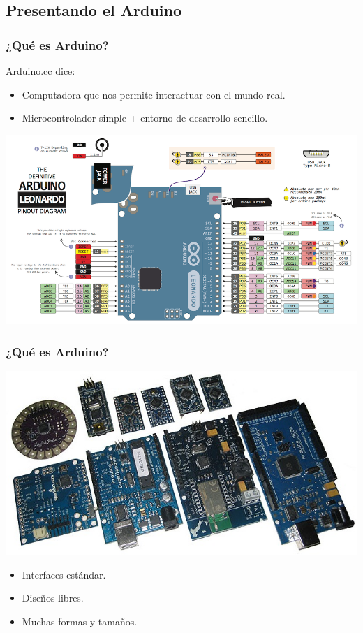 \documentclass[compress]{beamer}
\begin{document}
\subsection{Presentando el Arduino}

\begin{frame}
 \frametitle{¿Qué es Arduino?}
\begin{block}{Arduino.cc dice:} 
\begin{itemize}
 \item Computadora que nos permite interactuar con el mundo real.
 \item Microcontrolador simple + entorno de desarrollo sencillo.
\end{itemize}
\end{block}
\begin{center}
 \includegraphics[height=0.6\textheight]{./img/arduino-leonardo-pinout.png}
\end{center}
\end{frame}

\begin{frame}
 \frametitle{¿Qué es Arduino?}
 \includegraphics[width=\columnwidth]{./img/arduinos.jpg}
  \begin{itemize}
   \item Interfaces estándar.
   \item Diseños libres.
   \item Muchas formas y tamaños.
  \end{itemize}
\end{frame}
\end{document}
